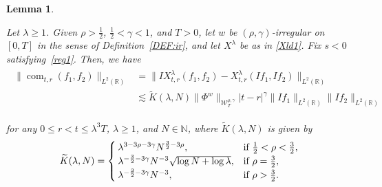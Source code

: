 \documentclass[letterpaper, 11pt,  reqno]{amsart}
\newtheorem{lemma}[theorem]{Lemma}
\DeclareMathOperator{\com}{com}
\newcommand{\1}{\hspace{0.5mm}\text{I}\hspace{0.5mm}}
\newcommand{\noi}{\noindent}
\newcommand{\R}{\mathbb{R}}
\newcommand{\g}{\gamma}
\newcommand{\ld}{\lambda}
\newcommand{\wt}{\widetilde}
\newcommand{\les}{\lesssim}
\newcommand{\N}{\mathbb{N}}
\newcommand{\W}{\mathcal{W}}
\numberwithin{equation}{section}
\numberwithin{theorem}{section}
\begin{document}
\begin{lemma}
\label{LEM:com2}

Let $\ld \ge 1$.
Given $\rho  >  \frac 12$,  $\frac 12 < \g < 1$,  and $T> 0$, 
let  $w$ be $(\rho,\g)$-irregular
on $[0, T]$ 
 in the sense of Definition~\ref{DEF:ir}, 
 and let $X^\ld$ be as in \eqref{Xld1}.
Fix  $s < 0$ satisfying~\eqref{reg1}.
Then, we have 
\begin{align}
\begin{aligned}
 \|\com_{t, r}(f_1, f_2) \|_{L^2(\R)}
 &  = \|IX^{\ld}_{t,r}( f _1, f _2) - X^{\ld}_{t,r} (I f _1,I f _2) \|_{L^2(\R)}\\
& \les
\wt    K(\ld, N )\| \Phi^{w} \|_{\W_{T}^{\rho, \g}}
      |t-r|^{\g}
\| I  f _1 \|_{L^2(\R)}   \| I  f _2 \|_{L^2(\R)}  
\end{aligned}
\label{RI1}
\end{align}





\noi
for any $0\leq r<t\leq \ld^3T$, $\ld \ge 1$, and $N \in \N$, 
where $ \wt K(\ld, N )$ is 
given by 
\begin{align}
\wt K(\ld, N )
= \begin{cases}
\ld^{3- 3\rho-3\g} N^{\frac 32 - 3\rho}, & \text{if $\frac 12 < \rho < \frac 32$}, \\
\ld^{- \frac 32 - 3\g} N^{-3} \sqrt{\log N + \log \ld}, & \text{if $\rho =  \frac 32$}, \\
\ld^{ - \frac 32 - 3\g } N^{-3}, & \text{if $ \rho >  \frac 32$}.
\end{cases}
\label{RI1a}
\end{align}





\end{lemma}
\end{document}
